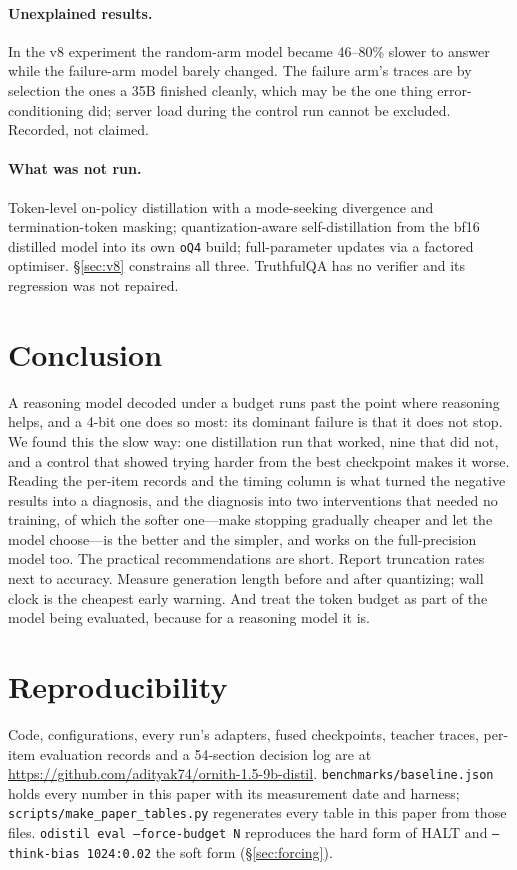 \documentclass[11pt]{article}
\newcommand{\HALT}{\textsc{HALT}}
\newcommand{\oQ}{\texttt{oQ4}}
\newcommand{\RepoURL}{\url{https://github.com/adityak74/ornith-1.5-9b-distil}}
\begin{document}
\paragraph{Unexplained results.}
In the v8 experiment the random-arm model became 46--80\% slower to answer
while the failure-arm model barely changed.  The failure arm's traces are by
selection the ones a 35B finished cleanly, which may be the one thing
error-conditioning did; server load during the control run cannot be
excluded.  Recorded, not claimed.

\paragraph{What was not run.}
Token-level on-policy distillation with a mode-seeking divergence and
termination-token masking; quantization-aware self-distillation from the bf16
distilled model into its own \oQ{} build; full-parameter updates via a factored
optimiser.  \S\ref{sec:v8} constrains all three.  TruthfulQA has no verifier and
its regression was not repaired.

\section{Conclusion}

A reasoning model decoded under a budget runs past the point where reasoning
helps, and a 4-bit one does so most: its dominant failure is that it does not
stop.  We found
this the slow way: one distillation run that worked, nine that did not, and a
control that showed trying harder from the best checkpoint makes it worse.
Reading the per-item records and the timing column is what turned the negative
results into a diagnosis, and the diagnosis into two interventions that needed
no training, of which the softer one---make stopping gradually cheaper and let
the model choose---is the better and the simpler, and works on the
full-precision model too.  The practical recommendations are short.  Report
truncation rates next to accuracy.  Measure generation length before and after
quantizing; wall clock is the cheapest early warning.  And treat the token
budget as part of the model being evaluated, because for a reasoning model it
is.

\section*{Reproducibility}

Code, configurations, every run's adapters, fused checkpoints, teacher traces,
per-item evaluation records and a 54-section decision log are at \RepoURL{}.
\texttt{benchmarks/baseline.json} holds every number in this paper with its
measurement date and harness; \texttt{scripts/make\_paper\_tables.py}
regenerates every table in this paper from those files.
\texttt{odistil eval --force-budget N} reproduces the hard form of \HALT{} and
\texttt{--think-bias 1024:0.02} the soft form (\S\ref{sec:forcing}).



\end{document}
